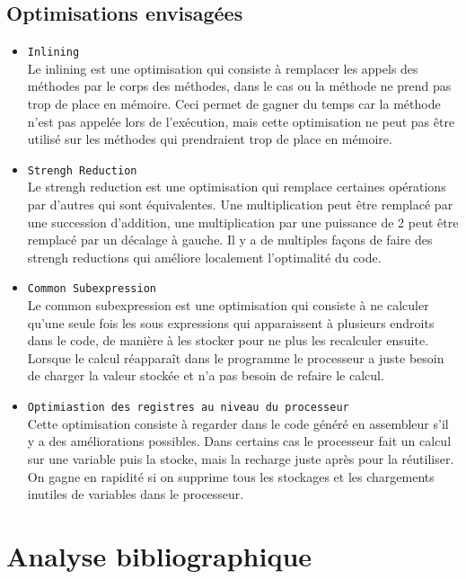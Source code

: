 \documentclass[a4paper]{article}
\begin{document}
\subsection{Optimisations envisagées}
\begin{itemize}
\item \texttt{Inlining} \\
Le inlining est une optimisation qui consiste à remplacer les appels des méthodes par le corps des méthodes, dans le cas ou la méthode ne prend pas trop de place en mémoire. Ceci permet de gagner du temps car la méthode n'est pas appelée lors de l'exécution, mais cette optimisation ne peut pas être utilisé sur les méthodes qui prendraient trop de place en mémoire.
\item \texttt{Strengh Reduction} \\
Le strengh reduction est une optimisation qui remplace certaines opérations par d'autres qui sont équivalentes. Une multiplication peut être remplacé par une succession d'addition, une multiplication par une puissance de 2 peut être remplacé par un décalage à gauche. Il y a de multiples façons de faire des strengh reductions qui améliore localement l'optimalité du code.
\item \texttt{Common Subexpression} \\
Le common subexpression est une optimisation qui consiste à ne calculer qu'une seule fois les sous expressions qui apparaissent à plusieurs endroits dans le code, de manière à les stocker pour ne plus les recalculer ensuite. Lorsque le calcul réapparaît dans le programme le processeur a juste besoin de charger la valeur stockée et n'a pas besoin de refaire le calcul.
\item \texttt{Optimiastion des registres au niveau du processeur} \\
Cette optimisation consiste à regarder dans le code généré en assembleur s'il y a des améliorations possibles. Dans certains cas le processeur fait un calcul sur une variable puis la stocke, mais la recharge juste après pour la réutiliser. On gagne en rapidité si on supprime tous les stockages et les chargements inutiles de variables dans le processeur.
     \end{itemize}
\section{Analyse bibliographique}
\end{document}
